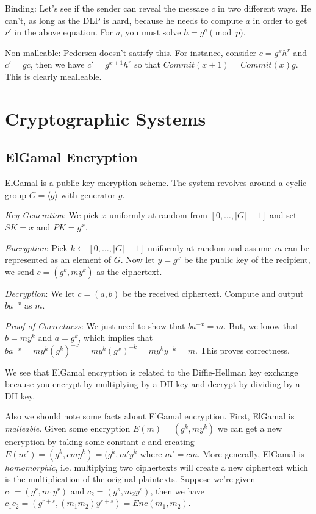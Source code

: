 \documentclass[psamsfonts]{amsart}
\begin{document}
Binding: Let's see if the sender can reveal the message $c$ in two different ways. He can't, as long as the DLP is hard, because he needs to compute $a$ in order to get $r'$ in the above equation. For $a$, you must solve $h = g^a \pmod{p}$.

Non-malleable: Pedersen doesn't satisfy this. For instance, consider $c = g^x h^r$ and $c' = g c$, then we have $c' = g^{x+1} h^r$ so that $Commit(x+1) = Commit(x)g$. This is clearly mealleable.

\newpage

\section{Cryptographic Systems}

\subsection{ElGamal Encryption}

ElGamal is a public key encryption scheme. The system revolves around a cyclic group $G = \langle g \rangle$ with generator $g$.

\emph{Key Generation}: We pick $x$ uniformly at random from $[0, \ldots, |G|-1]$ and set $SK = x$ and $PK = g^x$.

\emph{Encryption}: Pick $k \leftarrow [0, \ldots, |G|-1]$ uniformly at random and assume $m$ can be represented as an element of $G$. Now let $y = g^x$ be the public key of the recipient, we send $c = (g^k, m y^k)$ as the ciphertext.

\emph{Decryption}: We let $c = (a,b)$ be the received ciphertext. Compute and output $b a^{-x}$ as $m$.

\emph{Proof of Correctness}: We just need to show that $b a^{-x} = m$. But, we know that $b = m y^k$ and $a = g^k$, which implies that $b a^{-x} = m y^k (g^k)^{-x} = m y^k (g^x)^{-k} = m y^k y^{-k} = m$. This proves correctness.

We see that ElGamal encryption is related to the Diffie-Hellman key exchange because you encrypt by multiplying by a DH key and decrypt by dividing by a DH key.

Also we should note some facts about ElGamal encryption. First, ElGamal is \emph{malleable}. Given some encryption $E(m) = (g^k, m y^k)$ we can get a new encryption by taking some constant $c$ and creating $E(m') = (g^k, c m y^k) = (g^k, m' y^k$ where $m' = c m$. More generally, ElGamal is \emph{homomorphic}, i.e. multiplying two ciphertexts will create a new ciphertext which is the multiplication of the original plaintexts. Suppose we're given $c_1 = (g^r, m_1 y^r)$ and $c_2 = (g^s, m_2 y^s)$, then we have $c_1 c_2 = (g^{r+s}, (m_1 m_2) y^{r+s}) = Enc(m_1, m_2)$.
\end{document}
